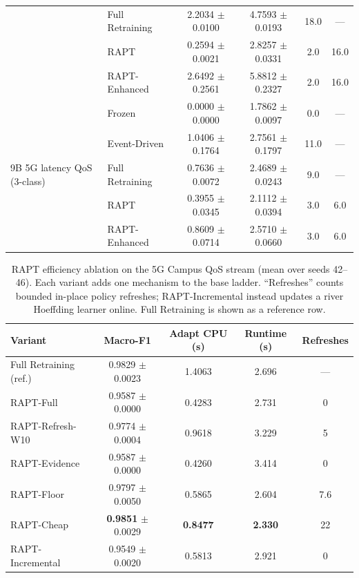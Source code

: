 \begin{table}[t]
\begin{tabular}{llcccc}
 & Full Retraining & 2.2034 $\pm$ 0.0100 & 4.7593 $\pm$ 0.0193 & 18.0 & --- \\
 & RAPT            & 0.2594 $\pm$ 0.0021 & 2.8257 $\pm$ 0.0331 & 2.0  & 16.0 \\
 & RAPT-Enhanced   & 2.6492 $\pm$ 0.2561 & 5.8812 $\pm$ 0.2327 & 2.0  & 16.0 \\
\midrule
\multirow{5}{*}{9B 5G latency QoS (3-class)}
 & Frozen          & 0.0000 $\pm$ 0.0000 & 1.7862 $\pm$ 0.0097 & 0.0  & --- \\
 & Event-Driven    & 1.0406 $\pm$ 0.1764 & 2.7561 $\pm$ 0.1797 & 11.0 & --- \\
 & Full Retraining & 0.7636 $\pm$ 0.0072 & 2.4689 $\pm$ 0.0243 & 9.0  & --- \\
 & RAPT            & 0.3955 $\pm$ 0.0345 & 2.1112 $\pm$ 0.0394 & 3.0  & 6.0 \\
 & RAPT-Enhanced   & 0.8609 $\pm$ 0.0714 & 2.5710 $\pm$ 0.0660 & 3.0  & 6.0 \\
\bottomrule
\end{tabular}
\end{table}

\begin{table}[t]
\centering
\caption{RAPT efficiency ablation on the 5G Campus QoS stream (mean over seeds
42--46). Each variant adds one mechanism to the base ladder. ``Refreshes'' counts
bounded in-place policy refreshes; RAPT-Incremental instead updates a river
Hoeffding learner online. Full Retraining is shown as a reference row.}
\label{tab:results_rapt_ablation}
\begin{tabular}{lcccc}
\toprule
Variant & Macro-F1 & Adapt CPU (s) & Runtime (s) & Refreshes \\
\midrule
Full Retraining (ref.) & 0.9829 $\pm$ 0.0023 & 1.4063 & 2.696 & --- \\
RAPT-Full              & 0.9587 $\pm$ 0.0000 & 0.4283 & 2.731 & 0 \\
RAPT-Refresh-W10       & 0.9774 $\pm$ 0.0004 & 0.9618 & 3.229 & 5 \\
RAPT-Evidence          & 0.9587 $\pm$ 0.0000 & 0.4260 & 3.414 & 0 \\
RAPT-Floor             & 0.9797 $\pm$ 0.0050 & 0.5865 & 2.604 & 7.6 \\
RAPT-Cheap             & \textbf{0.9851} $\pm$ 0.0029 & \textbf{0.8477} & \textbf{2.330} & 22 \\
RAPT-Incremental       & 0.9549 $\pm$ 0.0020 & 0.5813 & 2.921 & 0 \\
\bottomrule
\end{tabular}
\end{table}

